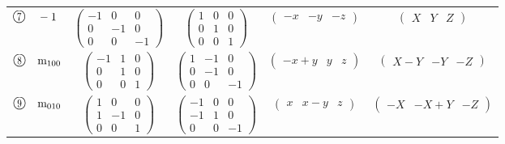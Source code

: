 \documentclass[fleqn,10pt,landscape]{jsarticle}
\begin{document}
\begin{center}
\begin{longtable}{lcccc}
$ {\ooalign{\hfil\resizebox{.8\width}{\height}{7}\hfil\crcr\raise.1ex\hbox{\large$\bigcirc$}}}\quad -1 $ & $ \begin{pmatrix} -1 & 0 & 0 \\ 0 & -1 & 0 \\ 0 & 0 & -1 \end{pmatrix} $ & $ \begin{pmatrix} 1 & 0 & 0 \\ 0 & 1 & 0 \\ 0 & 0 & 1 \end{pmatrix} $ & $ \begin{pmatrix} - x & - y & - z \end{pmatrix} $ & $ \begin{pmatrix} X & Y & Z \end{pmatrix} $ \\
$ {\ooalign{\hfil\resizebox{.8\width}{\height}{8}\hfil\crcr\raise.1ex\hbox{\large$\bigcirc$}}}\quad {\rm m}_{100} $ & $ \begin{pmatrix} -1 & 1 & 0 \\ 0 & 1 & 0 \\ 0 & 0 & 1 \end{pmatrix} $ & $ \begin{pmatrix} 1 & -1 & 0 \\ 0 & -1 & 0 \\ 0 & 0 & -1 \end{pmatrix} $ & $ \begin{pmatrix} - x + y & y & z \end{pmatrix} $ & $ \begin{pmatrix} X - Y & - Y & - Z \end{pmatrix} $ \\
$ {\ooalign{\hfil\resizebox{.8\width}{\height}{9}\hfil\crcr\raise.1ex\hbox{\large$\bigcirc$}}}\quad {\rm m}_{010} $ & $ \begin{pmatrix} 1 & 0 & 0 \\ 1 & -1 & 0 \\ 0 & 0 & 1 \end{pmatrix} $ & $ \begin{pmatrix} -1 & 0 & 0 \\ -1 & 1 & 0 \\ 0 & 0 & -1 \end{pmatrix} $ & $ \begin{pmatrix} x & x - y & z \end{pmatrix} $ & $ \begin{pmatrix} - X & - X + Y & - Z \end{pmatrix} $ \\

\end{longtable}
\end{center}
\end{document}
